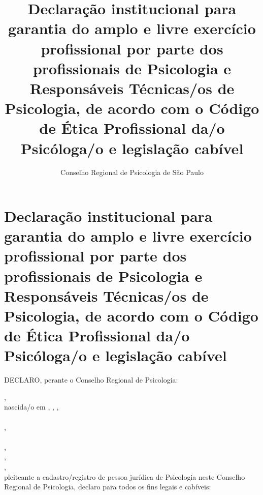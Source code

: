 \documentclass[openright, oneside, a4paper, article, 10pt, brazil]{abntex2}
\title{Declaração institucional para garantia do amplo e livre exercício profissional por parte dos profissionais de Psicologia e Responsáveis Técnicas/os de Psicologia, de acordo com o Código de Ética Profissional da/o Psicóloga/o e legislação cabível}
\author{Conselho Regional de Psicologia de São Paulo}
\begin{document}
\pagestyle{crp}
\centering
\Form

\setasuspacing{\OnehalfSpacing}
\section{Declaração institucional para garantia do amplo e livre exercício profissional por parte dos profissionais de Psicologia e Responsáveis Técnicas/os de Psicologia, de acordo com o Código de Ética Profissional da/o Psicóloga/o e legislação cabível}%
\setasuspacing{\DoubleSpacing}
\justifying
\vspace*{0.5\baselineskip}

DECLARO, perante o Conselho Regional de Psicologia:
\vspace*{\baselineskip}

 \hfill,\\
nascida/o em  ,  ,  ,\\
 \\
 ,\\
\\
 ,\\
 , \\
 ,\\
pleiteante a cadastro/registro de pessoa jurídica de Psicologia neste Conselho Regional de Psicologia, declaro para todos os fins legais e cabíveis:
\end{document}
